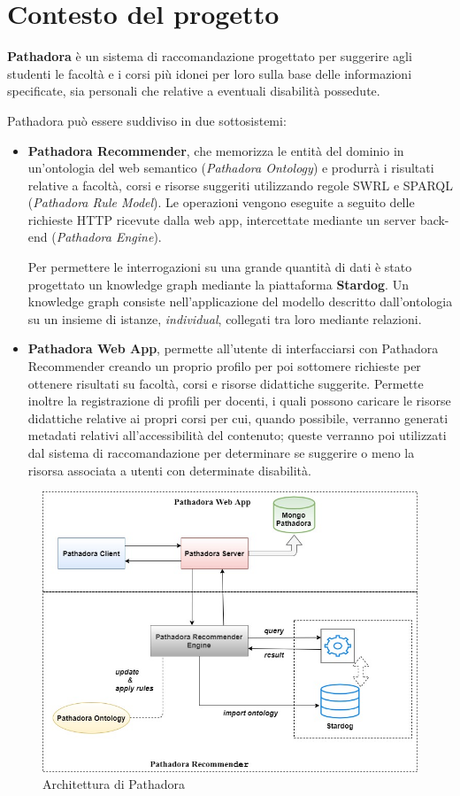 \clearpage{\pagestyle{empty}\cleardoublepage}
\chapter{Contesto del progetto}
\textbf{Pathadora} è un sistema di raccomandazione progettato per suggerire agli studenti le facoltà e i corsi più idonei per loro sulla base delle informazioni specificate, sia personali che relative a eventuali disabilità possedute. 

Pathadora può essere suddiviso in due sottosistemi: 
\begin{itemize}
\item \textbf{Pathadora Recommender}, che memorizza le entità del dominio in un'ontologia del web semantico (\textit{Pathadora Ontology}) e produrrà i risultati relative a facoltà, corsi e risorse suggeriti utilizzando regole SWRL e SPARQL (\textit{Pathadora Rule Model}). Le operazioni vengono eseguite a seguito delle richieste HTTP ricevute dalla web app, intercettate mediante un server back-end (\textit{Pathadora Engine}).

Per permettere le interrogazioni su una grande quantità di dati è stato progettato un knowledge graph mediante la piattaforma \textbf{Stardog}. Un knowledge graph consiste nell'applicazione del modello descritto dall'ontologia su un insieme di istanze, \textit{individual}, collegati tra loro mediante relazioni.
\item \textbf{Pathadora Web App}, permette all'utente di interfacciarsi con Pathadora Recommender creando un proprio profilo per poi sottomere richieste per ottenere risultati su facoltà, corsi e risorse didattiche suggerite. Permette inoltre la registrazione di profili per docenti, i quali possono caricare le risorse didattiche relative ai propri corsi per cui, quando possibile, verranno generati metadati relativi all'accessibilità del contenuto; queste verranno poi utilizzati dal sistema di raccomandazione per determinare se suggerire o meno la risorsa associata a utenti con determinate disabilità.
\end{itemize}

\begin{figure}[H]
\centering
\includegraphics[scale=0.4]{res/pathadora-arch.jpg}
\caption{Architettura di Pathadora}
\label{fig:pathadora-arch}
\end{figure}

